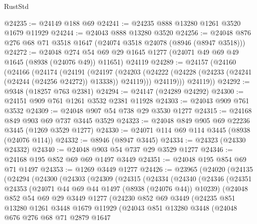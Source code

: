\begin{lexlean}{RustStd}
\begin{coremodule}
@24235 := @24149 @188 @69
@24241 := @24235 @888 @13280 @1261 @3520 @1679 @11929
@24244 := @24043 @888 @13280 @3520
@24256 := @24048 @876 @276 @68 @71 @3518 @1647 (@24074 @3518 @24078 (@8946 (@8947 @3518)))
@24272 := @24048
    @274
    @54
    @69
    @29
    @1645
    @1277
    (@24071 @49 @69 @49 @1645 (@8938 (@24076 @49)) @11651)
    @24119
@24289 := @24157
    (@24160
      (@24166
        (@24174
          (@24191
            (@24197
              (@24203 (@24222 (@24228 (@24233 (@24241 (@24244 (@24256 @24272)) @13338)) @24119)))
              @24119)))
        @24119))
@24292 := @9348 (@18257 @763 @2381)
@24294 := @24147 (@24289 @24292)
@24300 := @24151 @909 @761 @1261 @3532 @2381 @11928
@24303 := @24043 @909 @761 @3532
@24309 := @24048 @907 @54 @738 @29 @3530 @1277
@24315 := @24168 @849 @903 @69 @737 @3445 @3529
@24323 := @24048 @849 @905 @69 @22236 @3445 (@1269 @3529 @1277)
@24330 := @24071 @114 @69 @114 @3445 (@8938 (@24076 @114))
@24332 := @8946 (@8947 @3445)
@24334 := @24323 (@24330 @24332)
@24340 := @24048 @903 @54 @737 @29 @3529 @1277
@24346 := @24168 @195 @852 @69 @69 @1497 @3449
@24351 := @24048 @195 @854 @69 @71 @1497
@24353 := @1269 @3449 @1277
@24426 := @23965
    (@24020
      (@24135
        (@24294
          (@24300
            (@24303
              (@24309
                (@24315
                  (@24334
                    (@24340
                      (@24346
                        (@24351
                          @24353
                          (@24071 @44 @69 @44 @1497 (@8938 (@24076 @44)) @10239)
                          (@24048
                            @852
                            @54
                            @69
                            @29
                            @3449
                            @1277
                            (@24230
                              @852
                              @69
                              @3449
                              (@24235
                                @851
                                @13280
                                @1261
                                @3448
                                @1679
                                @11929
                                (@24043
                                  @851
                                  @13280
                                  @3448
                                  (@24048
                                    @676
                                    @276
                                    @68
                                    @71
                                    @2879
                                    @1647

\end{coremodule}
\end{lexlean}
